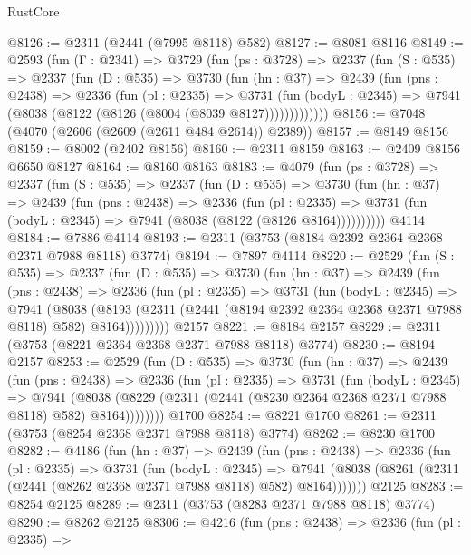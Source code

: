 \begin{lexlean}{RustCore}
\begin{coremodule}
@8126 := @2311 (@2441 (@7995 @8118) @582)
@8127 := @8081 @8116
@8149 := @2593
    (fun (Γ : @2341) =>
    @3729
      (fun (ps : @3728) =>
      @2337
        (fun (S : @535) =>
        @2337
          (fun (D : @535) =>
          @3730
            (fun (hn : @37) =>
            @2439
              (fun (pns : @2438) =>
              @2336
                (fun (pl : @2335) =>
                @3731
                  (fun (bodyL : @2345) =>
                  @7941 (@8038 (@8122 (@8126 (@8004 (@8039 @8127)))))))))))))
@8156 := @7048 (@4070 (@2606 (@2609 (@2611 @484 @2614)) @2389))
@8157 := @8149 @8156
@8159 := @8002 (@2402 @8156)
@8160 := @2311 @8159
@8163 := @2409 @8156 @6650 @8127
@8164 := @8160 @8163
@8183 := @4079
    (fun (ps : @3728) =>
    @2337
      (fun (S : @535) =>
      @2337
        (fun (D : @535) =>
        @3730
          (fun (hn : @37) =>
          @2439
            (fun (pns : @2438) =>
            @2336
              (fun (pl : @2335) =>
              @3731 (fun (bodyL : @2345) => @7941 (@8038 (@8122 (@8126 @8164))))))))))
    @4114
@8184 := @7886 @4114
@8193 := @2311 (@3753 (@8184 @2392 @2364 @2368 @2371 @7988 @8118) @3774)
@8194 := @7897 @4114
@8220 := @2529
    (fun (S : @535) =>
    @2337
      (fun (D : @535) =>
      @3730
        (fun (hn : @37) =>
        @2439
          (fun (pns : @2438) =>
          @2336
            (fun (pl : @2335) =>
            @3731
              (fun (bodyL : @2345) =>
              @7941
                (@8038
                  (@8193
                    (@2311 (@2441 (@8194 @2392 @2364 @2368 @2371 @7988 @8118) @582) @8164)))))))))
    @2157
@8221 := @8184 @2157
@8229 := @2311 (@3753 (@8221 @2364 @2368 @2371 @7988 @8118) @3774)
@8230 := @8194 @2157
@8253 := @2529
    (fun (D : @535) =>
    @3730
      (fun (hn : @37) =>
      @2439
        (fun (pns : @2438) =>
        @2336
          (fun (pl : @2335) =>
          @3731
            (fun (bodyL : @2345) =>
            @7941
              (@8038 (@8229 (@2311 (@2441 (@8230 @2364 @2368 @2371 @7988 @8118) @582) @8164))))))))
    @1700
@8254 := @8221 @1700
@8261 := @2311 (@3753 (@8254 @2368 @2371 @7988 @8118) @3774)
@8262 := @8230 @1700
@8282 := @4186
    (fun (hn : @37) =>
    @2439
      (fun (pns : @2438) =>
      @2336
        (fun (pl : @2335) =>
        @3731
          (fun (bodyL : @2345) =>
          @7941 (@8038 (@8261 (@2311 (@2441 (@8262 @2368 @2371 @7988 @8118) @582) @8164)))))))
    @2125
@8283 := @8254 @2125
@8289 := @2311 (@3753 (@8283 @2371 @7988 @8118) @3774)
@8290 := @8262 @2125
@8306 := @4216
    (fun (pns : @2438) =>
    @2336
      (fun (pl : @2335) =>

\end{coremodule}
\end{lexlean}
